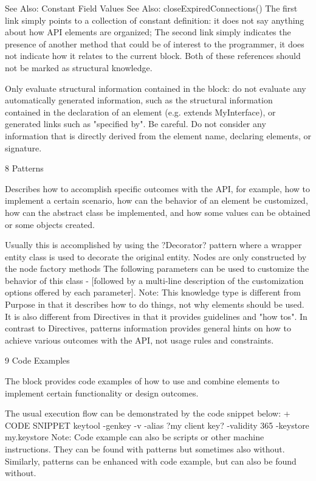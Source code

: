 See Also: Constant Field Values
See Also: closeExpiredConnections()
The first link simply points to a collection of constant definition: it does not say anything about how API elements are organized; The second link simply indicates the presence of another method that could be of interest to the programmer, it does not indicate how it relates to the current block. Both of these references should not be marked as structural knowledge.

Only evaluate structural information contained in the block: do not evaluate any automatically generated information, such as the structural information contained in the declaration of an element (e.g. extends MyInterface), or generated links such as "specified by". Be careful. Do not consider any information that is directly derived from the element name, declaring elements, or signature.

8 Patterns

Describes how to accomplish specific outcomes with the API, for example, how to implement a certain scenario, how can the behavior of an element be customized, how can the abstract class be implemented, and how some values can be obtained or some objects created.

Usually this is accomplished by using the ?Decorator? pattern where a wrapper entity class is used to decorate the original entity.
Nodes are only constructed by the node factory methods
The following parameters can be used to customize the behavior of this class - [followed by a multi-line description of the customization options offered by each parameter].
Note: This knowledge type is different from Purpose in that it describes how to do things, not why elements should be used. It is also different from Directives in that it provides guidelines and "how tos". In contrast to Directives, patterns information provides general hints on how to achieve various outcomes with the API, not usage rules and constraints.

9 Code Examples

The block provides code examples of how to use and combine elements to implement certain functionality or design outcomes.

The usual execution flow can be demonstrated by the code snippet below: + CODE SNIPPET
keytool -genkey -v -alias ?my client key? -validity 365 -keystore my.keystore
Note: Code example can also be scripts or other machine instructions. They can be found with patterns but sometimes also without. Similarly, patterns can be enhanced with code example, but can also be found without.

